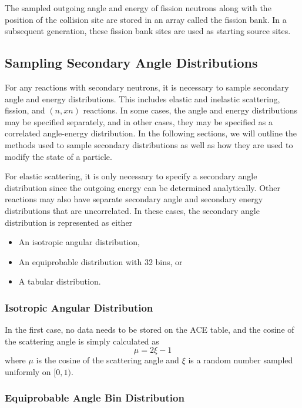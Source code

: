 The sampled outgoing angle and energy of fission neutrons along with the
position of the collision site are stored in an array called the fission
bank. In a subsequent generation, these fission bank sites are used as starting
source sites.

\subsection{Sampling Secondary Angle Distributions}
\label{sec:sample-angle}

For any reactions with secondary neutrons, it is necessary to sample secondary
angle and energy distributions. This includes elastic and inelastic scattering,
fission, and $(n,xn)$ reactions. In some cases, the angle and energy
distributions may be specified separately, and in other cases, they may be
specified as a correlated angle-energy distribution. In the following sections,
we will outline the methods used to sample secondary distributions as well as
how they are used to modify the state of a particle.

For elastic scattering, it is only necessary to specify a secondary angle
distribution since the outgoing energy can be determined analytically. Other
reactions may also have separate secondary angle and secondary energy
distributions that are uncorrelated. In these cases, the secondary angle
distribution is represented as either
\begin{itemize}
\item An isotropic angular distribution,
\item An equiprobable distribution with 32 bins, or
\item A tabular distribution.
\end{itemize}

\subsubsection{Isotropic Angular Distribution}

In the first case, no data needs to be stored on the ACE table, and the cosine
of the scattering angle is simply calculated as
\begin{equation}
  \label{eq:isotropic-angle}
  \mu = 2\xi - 1
\end{equation}
where $\mu$ is the cosine of the scattering angle and $\xi$ is a random number
sampled uniformly on $[0,1)$.

\subsubsection{Equiprobable Angle Bin Distribution}

